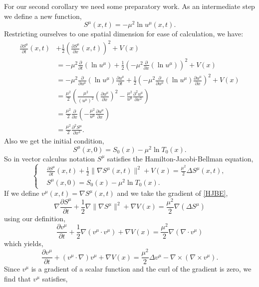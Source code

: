 \documentclass[a4paper,12pt,draft]{report}
\begin{document}
For our second corollary we need some preparatory work.  As an intermediate step we define a new function,
$$
S^\mu(x, t) = -\mu^2\ln u^\mu(x, t).
$$
Restricting ourselves to one spatial dimension for ease of calculation, we have:
\begin{align}
\frac{\partial S^\mu}{\partial t}(x, t) & + \frac{1}{2}\left(\frac{\partial S^\mu}{\partial x}(x, t)\right)^2 + V(x)\nonumber\\
& = -\mu^2\frac{\partial}{\partial t}(\ln u^\mu) + \frac{1}{2}\left(-\mu^2\frac{\partial}{\partial x}(\ln u^\mu)\right)^2 + V(x)\nonumber\\
& = -\mu^2\frac{\partial}{\partial u^\mu}(\ln u^\mu)\frac{\partial u^\mu}{\partial t} + \frac{1}{2}\left(-\mu^2\frac{\partial}{\partial u^\mu}(\ln u^\mu)\frac{\partial u^\mu}{\partial x}\right)^2 + V(x)\nonumber\\
& = \frac{\mu^2}{2}\left(\frac{\mu^2}{(u^\mu)^2}\left(\frac{\partial u^\mu}{\partial x}\right)^2 - \frac{\mu^2}{u^\mu}\frac{\partial^2 u^\mu}{\partial x^2}\right)\nonumber\\
& = \frac{\mu^2}{2}\frac{\partial}{\partial x}\left(-\frac{\mu^2}{u^\mu}\frac{\partial u^\mu}{\partial x}\right)\nonumber\\
& = \frac{\mu^2}{2}\frac{\partial^2 S^\mu}{\partial x^2}.\nonumber
\end{align}
Also we get the initial condition,
$$
S^\mu(x, 0) = S_0(x) - \mu^2\ln T_0(x).
$$
So in vector calculus notation $S^\mu$ satisfies the Hamilton-Jacobi-Bellman equation,
\begin{equation}
\left\{
\begin{aligned}
& \frac{\partial S^\mu}{\partial t}(x, t) + \frac{1}{2}\|\nabla S^\mu(x, t)\|^2 + V(x) = \frac{\mu^2}{2}\Delta S^\mu(x, t),\\ \label{HJBE}
& S^\mu(x, 0) = S_0(x) - \mu^2\ln T_0(x).
\end{aligned}
\right.
\end{equation}
If we define $v^\mu(x, t) = \nabla S^\mu(x, t)$ and we take the gradient of \eqref{HJBE},
$$
\nabla\frac{\partial S^\mu}{\partial t} + \frac{1}{2}\nabla\|\nabla S^\mu\|^2 + \nabla V(x) = \frac{\mu^2}{2}\nabla(\Delta S^\mu)
$$
using our definition,
$$
\frac{\partial v^\mu}{\partial t} + \frac{1}{2}\nabla(v^\mu \cdot v^\mu) + \nabla V(x) = \frac{\mu^2}{2}\nabla(\nabla \cdot v^\mu)
$$
which yields,
$$
\frac{\partial v^\mu}{\partial t} + (v^\mu\cdot \nabla)v^\mu + \nabla V(x) = \frac{\mu^2}{2}\Delta v^\mu - \nabla \times (\nabla \times v^\mu).
$$
Since $v^\mu$ is a gradient of a scalar function and the curl of the gradient is zero, we find that $v^\mu$ satisfies,
\end{document}
